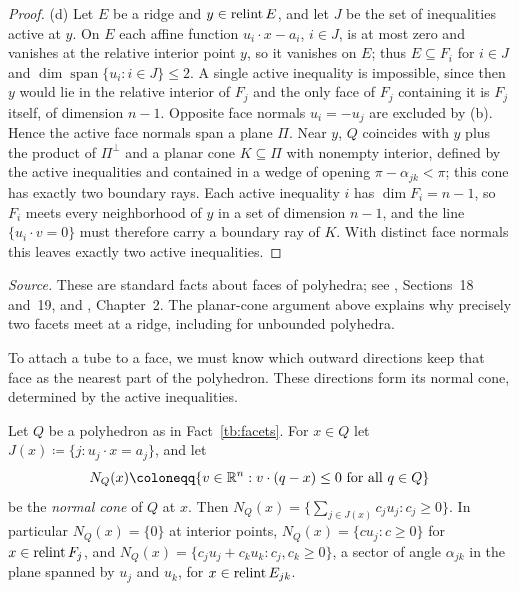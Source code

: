 \begin{proof}
(d) Let \(E\) be a ridge and \(y\in\operatorname{relint} E\), and let \(J\) be the set of
inequalities active at \(y\). On \(E\) each affine function
\(u_i\cdot x-a_i\), \(i\in J\), is at most zero and vanishes at the relative
interior point \(y\), so it vanishes on \(E\); thus \(E\subseteq F_i\) for
\(i\in J\) and \(\dim\operatorname{span}\{u_i:i\in J\}\le2\). A single active
inequality is impossible, since then \(y\) would lie in the relative interior
of \(F_j\) and the only face of \(F_j\) containing it is \(F_j\) itself, of
dimension \(n-1\). Opposite face normals \(u_i=-u_j\) are excluded by (b). Hence
the active face normals span a plane \(\Pi\). Near \(y\), \(Q\) coincides with
\(y\) plus the product of \(\Pi^\perp\) and a planar cone \(K\subseteq\Pi\)
with nonempty interior, defined by the active inequalities and contained in
a wedge of opening \(\pi-\alpha_{jk}<\pi\); this cone has exactly two
boundary rays. Each active inequality \(i\) has \(\dim F_i=n-1\), so
\(F_i\) meets every neighborhood of \(y\) in a set of dimension \(n-1\), and
the line \(\{u_i\cdot v=0\}\) must therefore carry a boundary ray of \(K\).
With distinct face normals this leaves exactly two active inequalities.
\end{proof}

\emph{Source.} These are standard facts about faces of polyhedra; see
, Sections~18 and~19, and , Chapter~2.
The planar-cone argument above explains why precisely two facets
meet at a ridge, including for unbounded polyhedra.

To attach a tube to a face, we must know which outward directions
keep that face as the nearest part of the polyhedron. These directions
form its normal cone, determined by the active inequalities.

\begin{fact}\label{tb:normalcone}
Let \(Q\) be a polyhedron as in Fact~\ref{tb:facets}. For \(x\in Q\) let
\(J(x)\coloneqq \{j:u_j\cdot x=a_j\}\), and let
\[
 N_Q(x)\coloneqq \{v\in\R^n:v\cdot(q-x)\le0\text{ for all }q\in Q\}
\]
be the \emph{normal cone} of \(Q\) at \(x\). Then
\(N_Q(x)=\{\sum_{j\in J(x)}c_ju_j:c_j\ge0\}\). In particular
\(N_Q(x)=\{0\}\) at interior points, \(N_Q(x)=\{cu_j:c\ge0\}\) for
\(x\in\operatorname{relint} F_j\), and \(N_Q(x)=\{c_ju_j+c_ku_k:c_j,c_k\ge0\}\), a sector of
angle \(\alpha_{jk}\) in the plane spanned by \(u_j\) and \(u_k\), for
\(x\in\operatorname{relint} E_{jk}\).
\end{fact}

